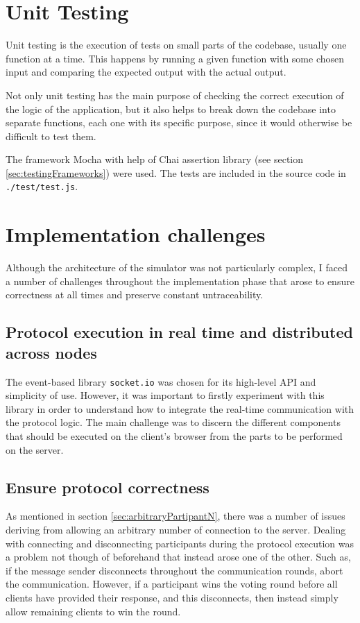 \section{Unit Testing}
Unit testing is the execution of tests on small parts of the codebase, usually one function at a time. This happens by running a given function with some chosen input and comparing the expected output with the actual output. 

Not only unit testing has the main purpose of checking the correct execution of the logic of the application, but it also helps to break down the codebase into separate functions, each one with its specific purpose, since it would otherwise be difficult to test them.

The framework Mocha with help of Chai assertion library (see section \ref{sec:testingFrameworks}) were used. The tests are included in the source code in \lstinline{./test/test.js}.

\section{Implementation challenges}
Although the architecture of the simulator was not particularly complex, I faced a number of challenges throughout the implementation phase that arose to ensure correctness at all times and preserve constant untraceability. 

\subsection{Protocol execution in real time and distributed across nodes}
The event-based library \lstinline{socket.io} was chosen for its high-level API and simplicity of use. However, it was important to firstly experiment with this library in order to understand how to integrate the real-time communication with the protocol logic. The main challenge was to discern the different components that should be executed on the client's browser from the parts to be performed on the server.

\subsection{Ensure protocol correctness}
As mentioned in section \ref{sec:arbitraryPartipantN}, there was a number of issues deriving from allowing an arbitrary number of connection to the server. Dealing with connecting and disconnecting participants during the protocol execution was a problem not though of beforehand that instead arose one of the other. Such as, if the message sender disconnects throughout the communication rounds, abort the communication. However, if a participant wins the voting round before all clients have provided their response, and this disconnects, then instead simply allow remaining clients to win the round. 

